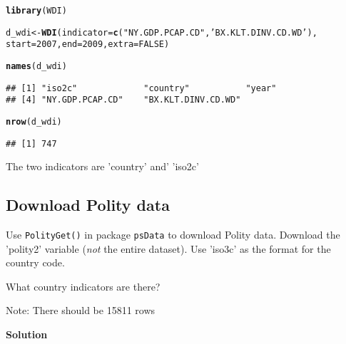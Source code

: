 \documentclass{article}\usepackage[]{graphicx}\usepackage[]{color}
\makeatletter
\newcommand{\hlnum}[1]{\textcolor[rgb]{0.686,0.059,0.569}{#1}}%
\newcommand{\hlstr}[1]{\textcolor[rgb]{0.192,0.494,0.8}{#1}}%
\newcommand{\hlstd}[1]{\textcolor[rgb]{0.345,0.345,0.345}{#1}}%
\newcommand{\hlkwb}[1]{\textcolor[rgb]{0.69,0.353,0.396}{#1}}%
\newcommand{\hlkwc}[1]{\textcolor[rgb]{0.333,0.667,0.333}{#1}}%
\newcommand{\hlkwd}[1]{\textcolor[rgb]{0.737,0.353,0.396}{\textbf{#1}}}%
\newenvironment{kframe}{%
 \def\at@end@of@kframe{}%
 \ifinner\ifhmode%
  \def\at@end@of@kframe{\end{minipage}}%
  \begin{minipage}{\columnwidth}%
 \fi\fi%
 \def\FrameCommand##1{\hskip\@totalleftmargin \hskip-\fboxsep
 \colorbox{shadecolor}{##1}\hskip-\fboxsep
     \hskip-\linewidth \hskip-\@totalleftmargin \hskip\columnwidth}%
 \MakeFramed {\advance\hsize-\width
   \@totalleftmargin\z@ \linewidth\hsize
   \@setminipage}}%
 {\par\unskip\endMakeFramed%
 \at@end@of@kframe}
\newenvironment{knitrout}{}{} %
\makeatother
\begin{document}
\begin{knitrout}
\color{fgcolor}\begin{kframe}
\begin{alltt}
\hlkwd{library}\hlstd{(WDI)}
\end{alltt}


{\ttfamily\noindent\itshape\color{messagecolor}{\#\# Loading required package: RJSONIO}}\begin{alltt}
\hlstd{d_wdi} \hlkwb{<-} \hlkwd{WDI}\hlstd{(}\hlkwc{indicator} \hlstd{=} \hlkwd{c}\hlstd{(}\hlstr{"NY.GDP.PCAP.CD"}\hlstd{,} \hlstr{'BX.KLT.DINV.CD.WD'}\hlstd{),}
             \hlkwc{start} \hlstd{=} \hlnum{2007}\hlstd{,} \hlkwc{end} \hlstd{=} \hlnum{2009}\hlstd{,} \hlkwc{extra} \hlstd{=} \hlnum{FALSE}\hlstd{)}

\hlkwd{names}\hlstd{(d_wdi)}
\end{alltt}
\begin{verbatim}
## [1] "iso2c"             "country"           "year"             
## [4] "NY.GDP.PCAP.CD"    "BX.KLT.DINV.CD.WD"
\end{verbatim}
\begin{alltt}
\hlkwd{nrow}\hlstd{(d_wdi)}
\end{alltt}
\begin{verbatim}
## [1] 747
\end{verbatim}
\end{kframe}
\end{knitrout}

The two indicators are 'country' and' 'iso2c'

\subsection{Download Polity data}

Use \verb`PolityGet()` in package \verb`psData` to download Polity data. Download the 'polity2' variable (\textit{not} the entire dataset). Use 'iso3c' as the format for the country code.

What country indicators are there?

Note: There should be 15811 rows

\textbf{Solution}
\end{document}
